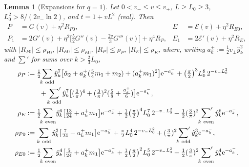 \documentclass[11pt,a4paper]{article}
\newtheorem{lemma}[theorem]{Lemma}
\theoremstyle{definition}
\theoremstyle{remark}
\newcommand{\ee}{\mathrm{e}}
\begin{document}
\begin{lemma}[Expansions for $q=1$]\label{lem:q1exp}
Let $0<v_-\le v\le v_+$, $L\ge L_0\ge3$, $L_0^2>8/(2v_-\ln2)$, and $t=1+vL^2$ (real). Then
\begin{align*}
  P&=G(v)+\eta^2R_{P0}, & E&=\mathcal E(v)+\eta^2R_{E0},\\
  P_1&=2G'(v)+\eta^2\bigl[\tfrac52G''(v)-\tfrac{2v}3G'''(v)\bigr]+\eta^4R_P, & E_1&=2\mathcal E'(v)+\eta^2R_E,
\end{align*}
with $|R_{P0}|\le\rho_{P0}$, $|R_{E0}|\le\rho_{E0}$, $|R_P|\le\rho_P$, $|R_E|\le\rho_E$, where, writing
$a_k^\pm:=\frac12v_\pm\hat y_k^2$ and $\sum'$ for sums over $k>\frac23L_0$,
\begin{align*}
 \rho_P&:=\tfrac12\!\!\sum_{k\ \rm odd}\!\hat y_k^7\bigl[\hat\alpha_2+a_k^+(\tfrac54m_1+m_2)+(a_k^+m_1)^2\bigr]\ee^{-a_k^-}
     +\bigl(\tfrac\pi2\bigr)^3L_0^8\,2^{-v_-L_0^2}\\
     &\qquad+\sideset{}{'}\sum_{k\ \rm odd}\hat y_k^7\bigl[(\tfrac3\pi)^4+(\tfrac3\pi)^2(\tfrac58+\tfrac{a_k^+}6)\bigr]\ee^{-a_k^-},\\
 \rho_E&:=\tfrac12\!\!\sum_{k\ \rm even}\!\hat y_k^6\bigl[\tfrac{13}{24}+a_k^+m_1\bigr]\ee^{-a_k^-}
     +\tfrac12\bigl(\tfrac\pi2\bigr)^4L_0^7\,2^{-v_-L_0^2}+\tfrac12(\tfrac3\pi)^2\sideset{}{'}\sum_{k\ \rm even}\hat y_k^6\ee^{-a_k^-},\\
 \rho_{P0}&:=\sum_{k\ \rm odd}\hat y_k^3\bigl[\tfrac7{24}+a_k^+m_1\bigr]\ee^{-a_k^-}+\tfrac\pi2L_0^4\,2^{-v_-L_0^2}
     +(\tfrac3\pi)^2\sideset{}{'}\sum_{k\ \rm odd}\hat y_k^3\ee^{-a_k^-},\\
 \rho_{E0}&:=\tfrac12\!\!\sum_{k\ \rm even}\!\hat y_k^4\bigl[\tfrac5{24}+a_k^+m_1\bigr]\ee^{-a_k^-}
     +\tfrac12\bigl(\tfrac\pi2\bigr)^2L_0^5\,2^{-v_-L_0^2}+\tfrac12(\tfrac3\pi)^2\sideset{}{'}\sum_{k\ \rm even}\hat y_k^4\ee^{-a_k^-}.
\end{align*}
\end{lemma}
\end{document}
